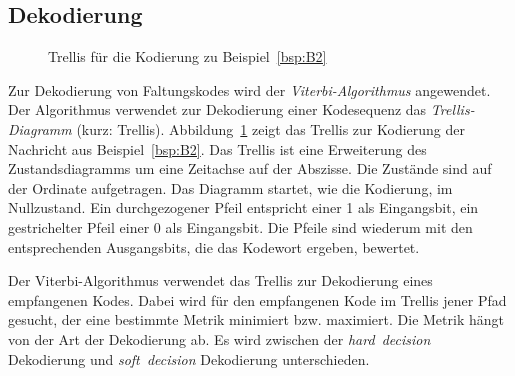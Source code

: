 \subsection{Dekodierung}
\label{kapitel:grundlagen_dekodierung}
\begin{figure}[t]
	\centering
		
\caption{Trellis für die Kodierung zu Beispiel~\ref{bsp:B2}}
\label{abb:trellis_kodierung}
\end{figure}
Zur Dekodierung von Faltungskodes wird der \emph{Viterbi-Algorithmus} angewendet. Der Algorithmus verwendet zur Dekodierung einer Kodesequenz das \emph{Trellis-Diagramm} (kurz: Trellis). Abbildung~\ref{abb:trellis_kodierung} zeigt das Trellis zur Kodierung der Nachricht aus Beispiel~\ref{bsp:B2}. Das Trellis ist eine Erweiterung des Zustandsdiagramms um eine Zeitachse auf der Abszisse. Die Zustände sind auf der Ordinate aufgetragen. Das Diagramm startet, wie die Kodierung, im Nullzustand. Ein durchgezogener Pfeil entspricht einer 1 als Eingangsbit, ein gestrichelter Pfeil einer 0 als Eingangsbit. Die Pfeile sind wiederum mit den entsprechenden Ausgangsbits, die das Kodewort ergeben, bewertet.

Der Viterbi-Algorithmus verwendet das Trellis zur Dekodierung eines empfangenen Kodes. Dabei wird für den empfangenen Kode im Trellis jener Pfad gesucht, der eine bestimmte Metrik minimiert bzw. maximiert. Die Metrik hängt von der Art der Dekodierung ab. Es wird zwischen der \emph{hard~decision} Dekodierung und \emph{soft~decision} Dekodierung unterschieden.

